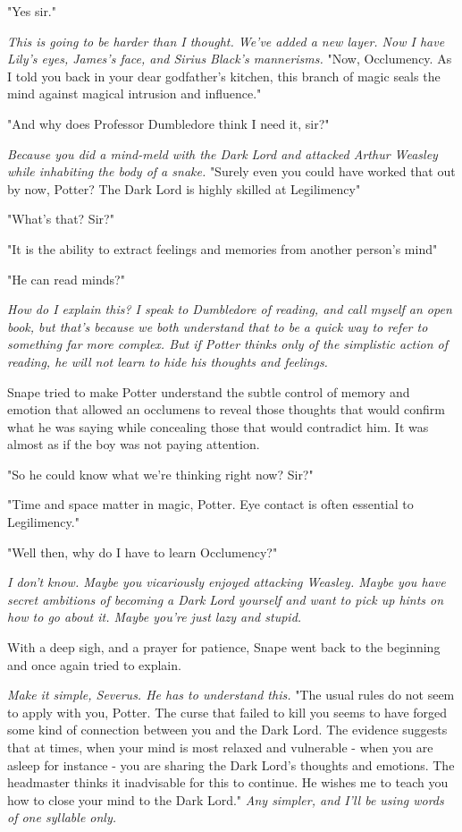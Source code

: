 "Yes{\el} sir."

\emph{This is going to be harder than I thought. We've added a new layer. Now I have Lily's eyes, James's face, and Sirius Black's mannerisms.} "Now, Occlumency. As I told you back in your dear godfather's kitchen, this branch of magic seals the mind against magical intrusion and influence."

"And why does Professor Dumbledore think I need it, sir?"

\emph{Because you did a mind-meld with the Dark Lord and attacked Arthur Weasley while inhabiting the body of a snake.} "Surely even you could have worked that out by now, Potter? The Dark Lord is highly skilled at Legilimency{\el}"

"What's that? Sir?"

"It is the ability to extract feelings and memories from another person's mind{\el}"

"He can read minds?"

\emph{How do I explain this? I speak to Dumbledore of reading, and call myself an open book, but that's because we both understand that to be a quick way to refer to something far more complex. But if Potter thinks only of the simplistic action of reading, he will not learn to hide his thoughts and feelings.}

Snape tried to make Potter understand the subtle control of memory and emotion that allowed an occlumens to reveal those thoughts that would confirm what he was saying while concealing those that would contradict him. It was almost as if the boy was not paying attention.

"So he could know what we're thinking right now? Sir?"

"Time and space matter in magic, Potter. Eye contact is often essential to Legilimency."

"Well then, why do I have to learn Occlumency?"

\emph{I don't know. Maybe you vicariously enjoyed attacking Weasley. Maybe you have secret ambitions of becoming a Dark Lord yourself and want to pick up hints on how to go about it. Maybe you're just lazy and stupid.}

With a deep sigh, and a prayer for patience, Snape went back to the beginning and once again tried to explain.

\emph{Make it simple, Severus. He has to understand this.} "The usual rules do not seem to apply with you, Potter. The curse that failed to kill you seems to have forged some kind of connection between you and the Dark Lord. The evidence suggests that at times, when your mind is most relaxed and vulnerable - when you are asleep for instance - you are sharing the Dark Lord's thoughts and emotions. The headmaster thinks it inadvisable for this to continue. He wishes me to teach you how to close your mind to the Dark Lord." \emph{Any simpler, and I'll be using words of one syllable only.}


